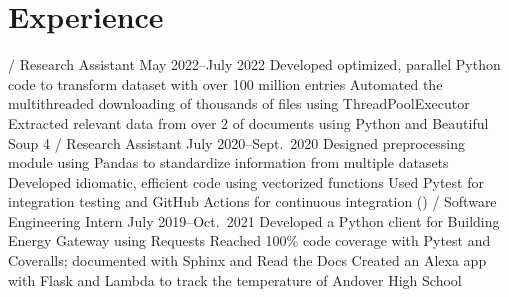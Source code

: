 \section{Experience}
\begin{outline}
     / Research Assistant
    \hfill May 2022--July 2022
        \1 Developed optimized, parallel Python code to transform dataset with over 100 million entries
        \1 Automated the multithreaded downloading of thousands of files using ThreadPoolExecutor
        \1 Extracted relevant data from over 2  of   documents using Python and Beautiful Soup 4
     / Research Assistant
    \hfill July 2020--Sept.\ 2020
        \1 Designed preprocessing module using Pandas to standardize information from multiple datasets
            \2 Developed idiomatic, efficient code using vectorized functions
            \2 Used Pytest for integration testing and GitHub Actions for continuous integration ()
     / Software Engineering Intern
    \hfill July 2019--Oct.\ 2021
        \1 Developed a Python client for Building Energy Gateway using Requests
            \2 Reached 100\% code coverage with Pytest and Coveralls; documented  with Sphinx and Read the Docs
        \1 Created an Alexa app with Flask and  Lambda to track the temperature of Andover High School
\end{outline}

